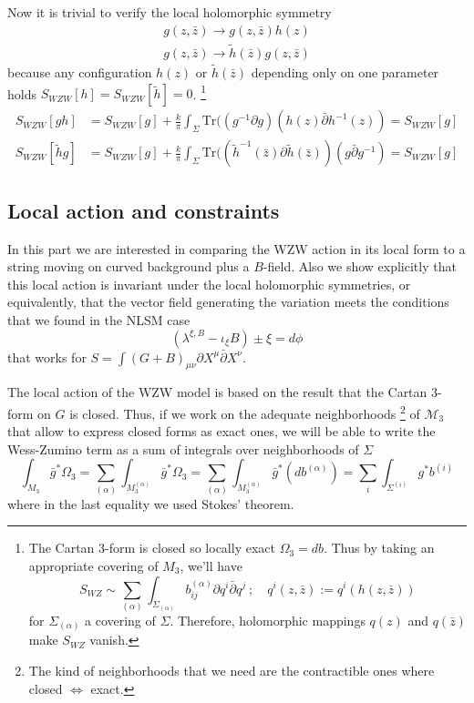 \documentclass[a4paper,12pt]{article}
\numberwithin{equation}{section}
\numberwithin{thm}{section}
\numberwithin{exm}{section}
\newcommand{\M}{\mathcal M}
\newcommand{\p}{\partial}
\newcommand{\pb}{\bar\partial}
\newcommand{\tr}{\mathrm{Tr}}
\newcommand{\wt}{\widetilde}
\newcommand{\lra}{\longrightarrow}
\newcommand{\mo}{^{-1}}
\newcommand{\zb}{{\bar z}}
\newcommand{\<}{{\langle}}
\renewcommand{\>}{{\rangle}}
\renewcommand{\a}{{\alpha}}
\renewcommand{\i}{{\iota}}
\renewcommand{\l}{{\lambda}}
\newcommand{\m}{{\mu}}
\newcommand{\n}{{\nu}}
\newcommand{\Om}{{\Omega}}
\renewcommand{\S}{{\Sigma}}
\begin{document}
Now it is trivial to verify the local holomorphic symmetry 
	\begin{align}
	g(z,\zb)\lra g(z,\zb)h(z) \\
	g(z,\zb)\lra \wt h(\zb) g(z,\zb)
	\end{align}
because any configuration $h(z)$ or $\wt h(\zb)$ depending only on one parameter holds $S_{WZW}[h] = S_{WZW}[\wt h] = 0$.%
\footnote{The Cartan 3-form is closed so locally exact $\Om_3 = db$. Thus by taking an appropriate covering of $M_3$, we'll have
$$ S_{WZ} \sim \sum_{(\a)} \int_{\S_{(\a)}} b_{ij}^{(\a)}\p q^i\pb q^j\ ;\quad q^i(z,\zb) := q^i(h(z,\zb)) $$ for $\S_{(\a)}$ a covering of $\S$. Therefore, holomorphic mappings $q(z)$ and $q(\zb)$ make $S_{WZ}$ vanish.}
	\begin{align}
	S_{WZW}[gh] & = S_{WZW}[g] + \frac{k}{\pi} \int_\S \tr( (g\mo\p g)(h(z)\pb h\mo(z) ) = S_{WZW}[g] \\
	S_{WZW}[\wt h g] & = S_{WZW}[g] + \frac{k}{\pi} \int_\S \tr( (\wt h\mo(\zb)\p \wt h(\zb))(g\pb g\mo ) = S_{WZW}[g]
	\end{align}


\subsection{Local action and constraints}
In this part we are interested in comparing the WZW action in its local form to a string moving on curved background plus a $B$-field. Also we show explicitly that this local action is invariant under the local holomorphic symmetries, or equivalently, that the vector field generating the variation meets the conditions that we found in the NLSM case
	\begin{equation}
	(\l^{\xi,B} - \i_\xi B)\pm \xi = d\phi
	\end{equation}
that works for $S = \int (G+B)_{\m\n} \p X^\m \pb X^\n$.

The local action of the WZW model is based on the result that the Cartan 3-form on $G$ is closed. Thus, if we work on the adequate neighborhoods%
\footnote{The kind of neighborhoods that we need are the contractible ones where closed $\Leftrightarrow$ exact.}
of $\M_3$ that allow to express closed forms as exact ones, we will be able to write the Wess-Zumino term as a sum of integrals over neighborhoods of $\S$
	\begin{equation}
	\int_{M_3} \bar g^* \Om_3 = \sum_{(\a)} \int_{M_3^{(\a)}} \bar g^*\Om_3 = \sum_{(\a)} \int_{M_3^{(\a)}} \bar g^*(db^{(\a)}) = \sum_{i} \int_{\S^{(i)}} g^*b^{(i)}
	\end{equation}
where in the last equality we used Stokes' theorem.
\end{document}
